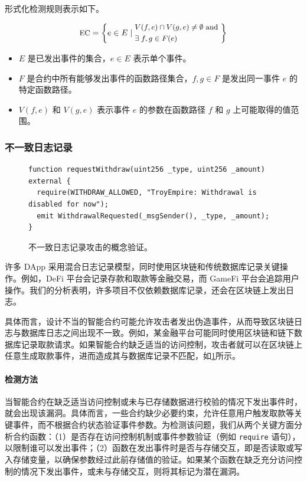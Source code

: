 形式化检测规则表示如下。

\begin{equation}
\small
\text{EC} = \left\{
e \in E \mid
\begin{aligned}
  & V(f, e) \cap V(g, e) \neq \emptyset \text{ and } \\
  & \exists \; f, g \in F(e)
\end{aligned}
\right\}
\end{equation}


\begin{itemize}
    \item \( E \) 是已发出事件的集合，\( e \in E \) 表示单个事件。
    \item \( F \) 是合约中所有能够发出事件的函数路径集合，\( f, g \in F \) 是发出同一事件 \( e \) 的特定函数路径。
    \item \( V(f, e) \) 和 \( V(g, e) \) 表示事件 \( e \) 的参数在函数路径 \( f \) 和 \( g \) 上可能取得的值范围。
\end{itemize}


\subsubsection{不一致日志记录}\label{vec:attack2}

\begin{figure}
\footnotesize
\small
\begin{lstlisting}[language=Solidity]
function requestWithdraw(uint256 _type, uint256 _amount) external {
  require(WITHDRAW_ALLOWED, "TroyEmpire: Withdrawal is disabled for now");
  emit WithdrawalRequested(_msgSender(), _type, _amount);
}
\end{lstlisting}
\caption{不一致日志记录攻击的概念验证。}\label{code:2}
\end{figure}

许多 DApp 采用混合日志记录模型，同时使用区块链和传统数据库记录关键操作。例如，DeFi 平台会记录存款和取款等金融交易，而 GameFi 平台会追踪用户操作。我们的分析表明，许多项目不仅依赖数据库记录，还会在区块链上发出日志。

具体而言，设计不当的智能合约可能允许攻击者发出伪造事件，从而导致区块链日志与数据库日志之间出现不一致。例如，某金融平台可能同时使用区块链和链下数据库记录取款请求。如果智能合约缺乏适当的访问控制，攻击者就可以在区块链上任意生成取款事件，进而造成其与数据库记录不匹配，如\cref{code:2}所示。


\paragraph{检测方法}
当智能合约在缺乏适当访问控制或未与已存储数据进行校验的情况下发出事件时，就会出现该漏洞。具体而言，一些合约缺少必要约束，允许任意用户触发取款等关键事件，而不根据合约状态验证事件参数。为检测该问题，我们从两个关键方面分析合约函数：（1）是否存在访问控制机制或事件参数验证（例如 \texttt{require} 语句），以限制谁可以发出事件；（2）函数在发出事件时是否与存储交互，即是否读取或写入存储变量，以确保参数经过此前存储值的验证。如果某个函数在缺乏充分访问控制的情况下发出事件，或未与存储交互，则将其标记为潜在漏洞。


